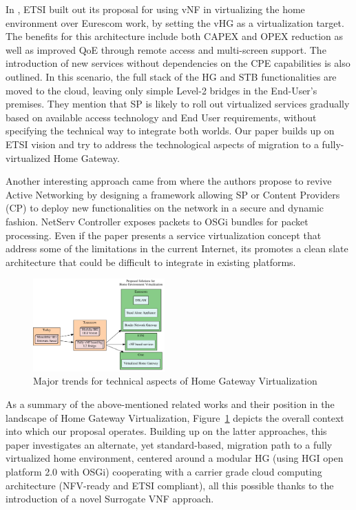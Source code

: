 In \cite{_network_2013}, ETSI built out its proposal for using vNF in virtualizing the home environment over Eurescom work, by setting the vHG as a virtualization target.
The benefits for this architecture include both CAPEX and OPEX reduction as well as improved QoE through remote access and multi-screen support.
The introduction of new services without dependencies on the CPE capabilities is also outlined.
In this scenario, the full stack of the HG and STB functionalities are moved to the cloud, leaving only simple Level-2 bridges in the End-User's premises.
They mention that SP is likely to roll out virtualized services gradually based on available access technology and End User requirements, without specifying the technical way to integrate both worlds.
Our paper builds up on ETSI vision and try to address the technological aspects of migration to a fully-virtualized Home Gateway.


Another interesting approach came from \cite{lee_netserv:_2011} where the authors  propose to revive Active Networking by designing a framework allowing SP or Content Providers (CP) to deploy new functionalities on the network in a secure and dynamic fashion.
NetServ Controller exposes packets to OSGi bundles for packet processing. Even if the paper presents a service virtualization concept that address some of the limitations in the current Internet, its promotes a clean slate  architecture that could be difficult to integrate in existing platforms.

\begin{figure}
  \begin{center}
    \includegraphics[width=0.45\textwidth]{fig/vhgtrends.pdf}
  \end{center}
  \caption{ Major trends for technical aspects of Home Gateway Virtualization
    \label{fig:trends}
  }
\end{figure}	
As a summary of the above-mentioned related works and their position in the landscape of Home Gateway Virtualization, Figure~\ref{fig:trends} depicts the overall context into which our proposal operates.
Building up on the latter approaches, this paper investigates an alternate, yet standard-based, migration path to a fully virtualized home environment, centered around a modular HG (using HGI open platform 2.0 with OSGi) cooperating with a carrier grade cloud computing architecture (NFV-ready and ETSI compliant), all this possible thanks to the introduction of a novel Surrogate VNF approach.




